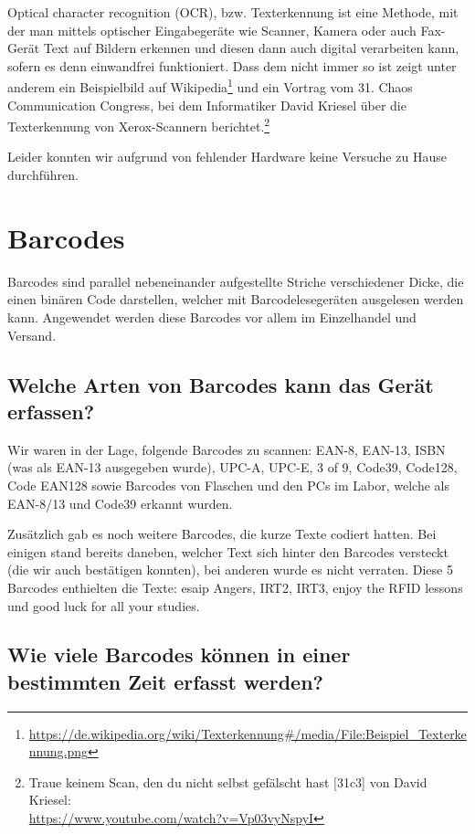 \documentclass[paper=a4,fontsize=11pt,headsepline,footsepline,parskip=half]{scrartcl}
\begin{document}
\begin{titlepage}
Optical character recognition (OCR), bzw. Texterkennung ist eine Methode, mit der man mittels optischer
Eingabegeräte wie Scanner, Kamera oder auch Fax-Gerät Text auf Bildern erkennen und diesen dann auch
digital verarbeiten kann, sofern es denn einwandfrei funktioniert. Dass dem nicht immer so ist zeigt
unter anderem ein Beispielbild auf Wikipedia\footnote{\url{https://de.wikipedia.org/wiki/Texterkennung\#/media/File:Beispiel_Texterkennung.png}}
und ein Vortrag vom 31. Chaos Communication Congress, bei dem Informatiker David Kriesel über die Texterkennung
von Xerox-Scannern berichtet.\footnote{Traue keinem Scan, den du nicht selbst gefälscht hast [31c3] von David Kriesel:\\ \url{https://www.youtube.com/watch?v=Vp03vyNspyI}}

Leider konnten wir aufgrund von fehlender Hardware keine Versuche zu Hause durchführen.

\end{titlepage}

\section{Barcodes}

Barcodes sind parallel nebeneinander aufgestellte Striche verschiedener Dicke, die einen binären Code darstellen,
welcher mit Barcodelesegeräten ausgelesen werden kann. Angewendet werden diese Barcodes vor allem im Einzelhandel und Versand.

\subsection{Welche Arten von Barcodes kann das Gerät erfassen?}

Wir waren in der Lage, folgende Barcodes zu scannen: EAN-8, EAN-13, ISBN (was als EAN-13 ausgegeben wurde),
UPC-A, UPC-E, 3 of 9, Code39, Code128, Code EAN128 sowie Barcodes von Flaschen und den PCs im Labor, welche als EAN-8/13 und Code39 erkannt wurden.

Zusätzlich gab es noch weitere Barcodes, die kurze Texte codiert hatten. Bei einigen stand bereits daneben, welcher Text sich hinter den Barcodes
versteckt (die wir auch bestätigen konnten), bei anderen wurde es nicht verraten. Diese 5 Barcodes enthielten die Texte:
\glqq esaip Angers\grqq, \glqq IRT2\grqq, \glqq IRT3\grqq, \glqq enjoy the RFID lessons\grqq{} und \glqq good luck for all your studies.\grqq

\subsection{Wie viele Barcodes können in einer bestimmten Zeit erfasst werden?}
\end{document}
